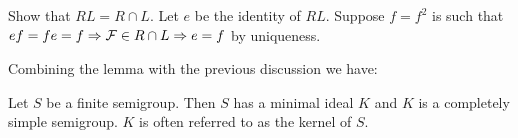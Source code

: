 
%

Show that $RL = R \cap L$.  
Let $e$ be the identity of $RL$.  
Suppose $f = f^2$ is such that $ef = fe = f \Rightarrow \mathcal{F} \in R \cap L \Rightarrow e = f$ by uniqueness.

Combining the lemma with the previous discussion we have:

\begin{theorem}  	\label{thm:2.2}
Let $S$ be a finite semigroup.  
Then $S$ has a minimal ideal $K$ and $K$ is a completely simple semigroup.  
$K$ is often referred to as the kernel of $S$.
\end{theorem}
